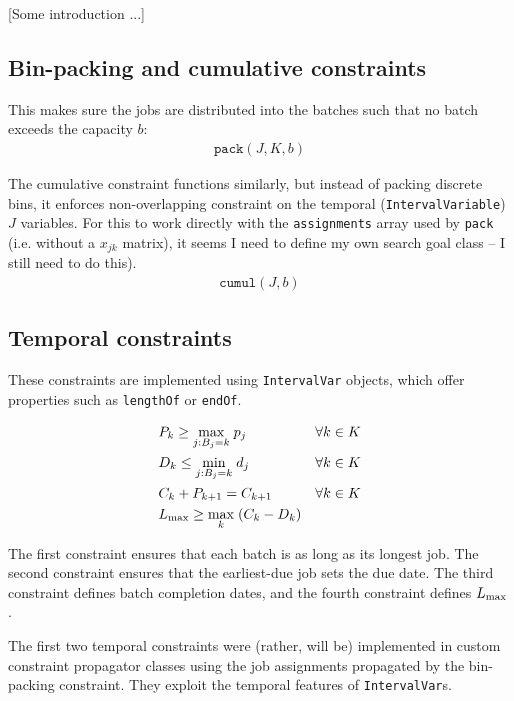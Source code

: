 \documentclass[13pt, letterpaper, twoside]{book}
\begin{document}
[Some introduction ...]

\subsection{Bin-packing and cumulative constraints}
This makes sure the jobs are distributed into the batches such that no batch
exceeds the capacity $b$:
\begin{align}
\mathtt{pack}(J, K, b)
\end{align}

The cumulative constraint functions similarly, but instead of packing
discrete bins, it enforces non-overlapping constraint on the temporal
(\texttt{IntervalVariable}) $J$ variables. {\color{darkred} For this to work
directly with the \texttt{assignments} array used by \texttt{pack} (i.e. without
a $x_{jk}$ matrix), it seems I need to define my own search goal class -- I
still need to do this).}
\begin{align}
\mathtt{cumul}(J, b)
\end{align}

\subsection{Temporal constraints}
These constraints are implemented using \texttt{IntervalVar} objects, which
offer properties such as \texttt{lengthOf} or \texttt{endOf}.

\begin{alignat}{2}
& P_k \geq \underset{j : B_j = k}{\max} \; p_j \quad &&
\forall k \in K \\
& D_k \leq \underset{j : B_j = k}{\min}\; d_j \quad && \forall k \in K \\
& C_k + P_{k+1} = C_{k+1} \quad && \forall k \in K \\
& L_{\text{max}} \geq \underset{k}{\max} \;(C_k - D_k) && 
\end{alignat}

The first constraint ensures that each batch is as long as its longest job. 
The second constraint ensures that the earliest-due job sets the due date.
The third constraint defines batch completion dates, and the fourth constraint defines $L_{\text{max}}$.

The first two temporal constraints were {\color{darkred}(rather, will be)}
implemented in custom constraint propagator classes using the job assignments
propagated by the bin-packing constraint. They exploit the temporal features of
\texttt{IntervalVar}s.
\end{document}
